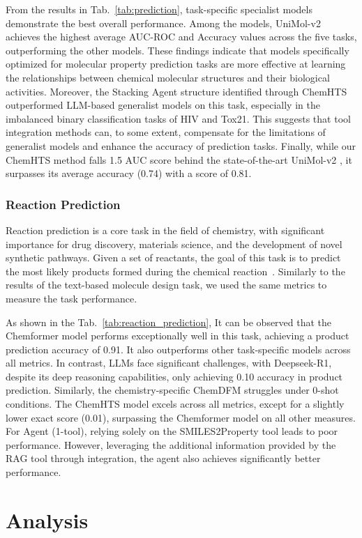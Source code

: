From the results in Tab.~\ref{tab:prediction}, task-specific specialist models demonstrate the best overall performance. Among the models, UniMol-v2 achieves the highest average AUC-ROC and Accuracy values across the five tasks, outperforming the other models. These findings indicate that models specifically optimized for molecular property prediction tasks are more effective at learning the relationships between chemical molecular structures and their biological activities.
Moreover, the Stacking Agent structure identified through ChemHTS outperformed LLM-based generalist models on this task, especially in the imbalanced binary classification tasks of HIV and Tox21. This suggests that tool integration methods can, to some extent, compensate for the limitations of generalist models and enhance the accuracy of prediction tasks.
Finally, while our ChemHTS method falls 1.5 AUC score behind the state-of-the-art UniMol-v2 , it surpasses its average accuracy (0.74) with a score of 0.81.
\subsubsection{Reaction Prediction}
Reaction prediction is a core task in the field of chemistry, with significant importance for drug discovery, materials science, and the development of novel synthetic pathways. Given a set of reactants, the goal of this task is to predict the most likely products formed during the chemical reaction~\cite{guo2024modeling,Schwaller_2019}.
Similarly to the results of the text-based molecule design task, we used the same metrics to measure the task performance.

As shown in the Tab.~\ref{tab:reaction_prediction}, It can be observed that the Chemformer model performs exceptionally well in this task, achieving a product prediction accuracy of 0.91. It also outperforms other task-specific models across all metrics. In contrast, LLMs face significant challenges, with Deepseek-R1, despite its deep reasoning capabilities, only achieving 0.10 accuracy in product prediction. Similarly, the chemistry-specific ChemDFM struggles under 0-shot conditions. The ChemHTS model excels across all metrics, except for a slightly lower exact score (0.01), surpassing the Chemformer model on all other measures. For Agent (1-tool), relying solely on the SMILES2Property tool leads to poor performance. However, leveraging the additional information provided by the RAG tool through integration, the agent also achieves significantly better performance.
\section{Analysis}
